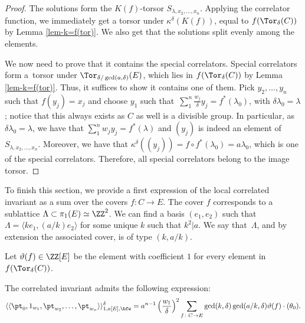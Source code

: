 \begin{proof}
 The solutions form the $K(f)$-torsor $S_{\lambda,x_2,\dots,x_n}$. Applying the correlator function, we immediately get a torsor under $\kappa^\delta(K(f))$, equal to $f(\Tor_\delta(C))$ by Lemma \ref{lem-k=f(tor)}. We also get that the solutions split evenly among the elements.

 We now need to prove that it contains the special correlators. Special correlators form a~torsor under $\Tor_{\delta/\gcd(a,\delta)}(E)$, which lies in $f(\Tor_\delta(C))$ by Lemma \ref{lem-k=f(tor)}. Thus, it suffices to show it contains one of them.
 Pick $y_2,\dots,y_n$ such that $f(y_j)=x_j$ and choose $y_1$ such that~${\sum_1^n\frac{w_j}{\delta}y_j=f^*(\lambda_0)}$, with $\delta\lambda_0=\lambda$; notice that this always exists as $C$ as well is a divisible group. In particular, as $\delta\lambda_0=\lambda$, we have that $\sum_1^n w_jy_j=f^*(\lambda)$ and $(y_j)$ is indeed an element of $S_{\lambda,x_2,\dots,x_n}$. Moreover, we have that
$\kappa^\delta((y_j))=f\circ f^*(\lambda_0)=a\lambda_0$,
 which is one of the special correlators. Therefore, all special correlators belong to the image torsor.
\end{proof}

To finish this section, we provide a first expression of the local correlated invariant as a sum over the covers $f\colon C\to E$. The cover $f$ corresponds to a sublattice $\Lambda\subset\pi_1(E)\simeq\ZZ^2$. We can find a basis $(e_1,e_2)$ such that $\Lambda=\langle ke_1,(a/k)e_2\rangle$ for some unique $k$ such that $k^2|a$. We say that~$\Lambda$, and by extension the associated cover, is of type $(k,a/k)$.

Let $\vartheta(f)\in\ZZ[E]$ be the element with coefficient $1$ for every element in $f(\Tor_\delta(C))$.

\begin{prop}\label{prop-first-expression-local-correlated-inv}
 The correlated invariant admits the following expression:
 \[ \langle\langle\pt_0,1_{w_1},\pt_{w_2},\dots,\pt_{w_n} \rangle\rangle^\delta_{1,a[E],\bfw} = a^{n-1}\left(\frac{w_1}{\delta}\right)^2\sum_{f\colon C\to E} \gcd(k,\delta)\gcd(a/k,\delta) \vartheta(f)\cdot (\theta_0). \]
\end{prop}

